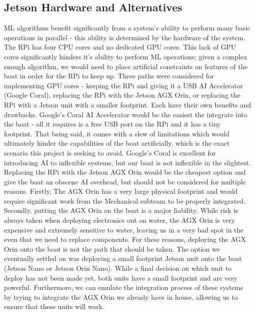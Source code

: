 \documentclass{article}
\begin{document}
\subsection{Jetson Hardware and Alternatives}
ML algorithms benefit significantly from a system's ability to perform many basic operations in parallel - this ability is determined by the hardware of the system. The RPi has four CPU cores and no dedicated GPU cores. This lack of GPU cores significantly hinders it's ability to perform ML operations; given a complex enough algorithm, we would need to place artificial constraints on features of the boat in order for the RPi to keep up.
\newline
\indent Three paths were considered for implementing GPU cores - keeping the RPi and giving it a USB AI Accelerator (Google Coral), replacing the RPi with the Jetson AGX Orin, or replacing the RPi with a Jetson unit with a smaller footprint. Each have their own benefits and drawbacks.
\newline
\indent Google's Coral AI Accelerator would be the easiest the integrate into the boat - all it requires is a free USB port on the RPi and it has a tiny footprint. That being said, it comes with a slew of limitations which would ultimately hinder the capabilities of the boat artificially, which is the exact scenario this project is seeking to avoid. Google's Coral is excellent for introducing AI to inflexible systems, but our boat is not inflexible in the slightest.
\newline
\indent Replacing the RPi with the Jetson AGX Orin would be the cheapest option and give the boat an obscene AI overhead, but should not be considered for multiple reasons. Firstly, The AGX Orin has a very large physical footprint and would require significant work from the Mechanical subteam to be properly integrated. Secondly, putting the AGX Orin on the boat is a major liability. While risk is always taken when deploying electronics out on water, the AGX Orin is very expensive and extremely sensitive to water, leaving us in a very bad spot in the even that we need to replace components. For these reasons, deploying the AGX Orin onto the boat is not the path that should be taken.
\newline
\indent The option we eventually settled on was deploying a small footprint Jetson unit onto the boat (Jetson Nano or Jetson Orin Nano). While a final decision on which unit to deploy has not been made yet, both units have a small footprint and are very powerful. Furthermore, we can emulate the integration process of these systems by trying to integrate the AGX Orin we already have in house, allowing us to ensure that these units will work.
\end{document}
